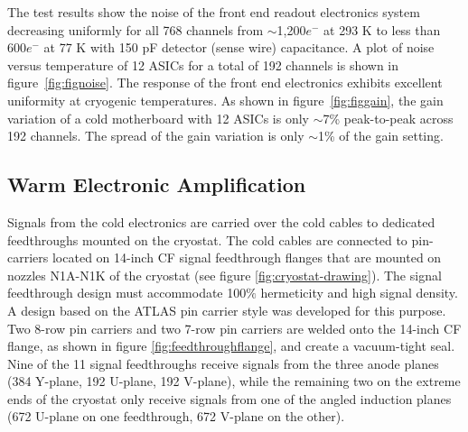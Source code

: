 The test results show the noise of the front end readout electronics system decreasing uniformly for all 768 channels from $\sim$1,200$e^{-}$ at 293 K to less than 600$e^{-}$ at 77 K with 150 pF detector (sense wire) capacitance. A plot of noise versus temperature of 12 ASICs for a total of 192 channels is shown in figure~\ref{fig:fignoise}. The response of the front end electronics exhibits excellent uniformity at cryogenic temperatures. As shown in figure~\ref{fig:figgain}, the gain variation of a cold motherboard with 12 ASICs is only $\sim$7\% peak-to-peak across 192 channels. The spread of the gain variation is only $\sim$1\% of the gain setting.

\subsection{Warm Electronic Amplification}
\label{sec:warmelectronics}
Signals from the cold electronics are carried over the cold cables to dedicated feedthroughs mounted on the cryostat.  The cold cables are connected to pin-carriers located on 14-inch CF signal feedthrough flanges that are mounted on nozzles N1A-N1K of the cryostat (see figure \ref{fig:cryostat-drawing}).  The signal feedthrough design must accommodate 100$\%$ hermeticity and high signal density. A design based on the ATLAS pin carrier style was developed for this purpose.  Two 8-row pin carriers and two 7-row pin carriers are welded onto the 14-inch CF flange, as shown in figure \ref{fig:feedthroughflange}, and create a vacuum-tight seal.  Nine of the 11 signal feedthroughs receive signals from the three \lartpc anode planes (384 Y-plane, 192 U-plane, 192 V-plane), while the remaining two on the extreme ends of the cryostat only receive signals from one of the angled induction planes (672 U-plane on one feedthrough, 672 V-plane on the other).

